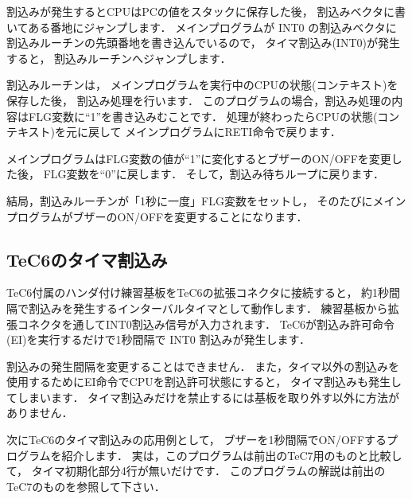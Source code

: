 割込みが発生するとCPUはPCの値をスタックに保存した後，
割込みベクタに書いてある番地にジャンプします．
メインプログラムが INT0 の割込みベクタに
割込みルーチンの先頭番地を書き込んでいるので，
タイマ割込み(INT0)が発生すると，
割込みルーチンへジャンプします．

割込みルーチンは，
メインプログラムを実行中のCPUの状態(コンテキスト)を保存した後，
割込み処理を行います．
このプログラムの場合，割込み処理の内容はFLG変数に``1''を書き込みむことです．
処理が終わったらCPUの状態(コンテキスト)を元に戻して
メインプログラムにRETI命令で戻ります．

メインプログラムはFLG変数の値が``1''に変化するとブザーのON/OFFを変更した後，
FLG変数を``0''に戻します．
そして，割込み待ちループに戻ります．

結局，割込みルーチンが「1秒に一度」FLG変数をセットし，
そのたびにメインプログラムがブザーのON/OFFを変更することになります．

\subsection{TeC6のタイマ割込み}

TeC6付属のハンダ付け練習基板をTeC6の拡張コネクタに接続すると，
約1秒間隔で割込みを発生するインターバルタイマとして動作します．
練習基板から拡張コネクタを通してINT0割込み信号が入力されます．
TeC6が割込み許可命令(EI)を実行するだけで1秒間隔で INT0 割込みが発生します．

割込みの発生間隔を変更することはできません．
また，タイマ以外の割込みを使用するためにEI命令でCPUを割込許可状態にすると，
タイマ割込みも発生してしまいます．
タイマ割込みだけを禁止するには基板を取り外す以外に方法がありません．

次にTeC6のタイマ割込みの応用例として，
ブザーを1秒間隔でON/OFFするプログラムを紹介します．
実は，このプログラムは前出のTeC7用のものと比較して，
タイマ初期化部分4行が無いだけです．
このプログラムの解説は前出のTeC7のものを参照して下さい．

